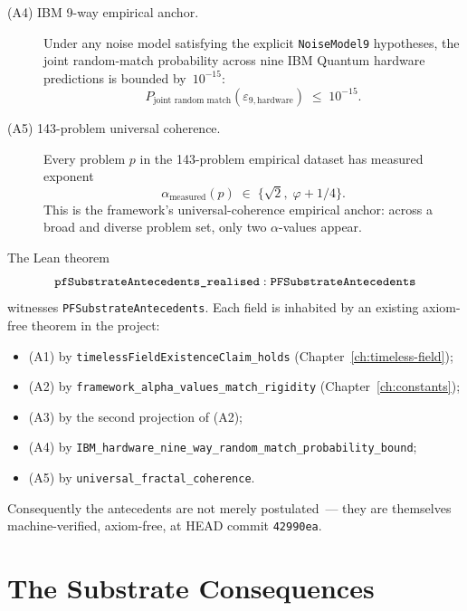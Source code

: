 \begin{definition}
\begin{description}
\item[\textnormal{(A4) IBM 9-way empirical anchor.}]
Under any noise model satisfying the explicit
\texttt{NoiseModel9} hypotheses, the joint random-match
probability across nine IBM Quantum hardware predictions is
bounded by~$10^{-15}$:
\[
P_{\text{joint random match}}(\varepsilon_{9,\text{hardware}})
\;\le\; 10^{-15}.
\]

\item[\textnormal{(A5) 143-problem universal coherence.}]
Every problem $p$ in the 143-problem empirical dataset has
measured exponent
\[
\alpha_{\text{measured}}(p)
\;\in\; \{\sqrt{2}, \; \varphi + 1/4\}.
\]
This is the framework's universal-coherence empirical anchor:
across a broad and diverse problem set, only two $\alpha$-values
appear.
\end{description}
\end{definition}

\begin{theorem}
\label{thm:pf-substrate-antecedents-realised}
The Lean theorem
\[
\texttt{pf\allowbreak{}Substrate\allowbreak{}Antecedents\_\allowbreak{}realised} :
\texttt{PFSubstrateAntecedents}
\]
witnesses \texttt{PFSubstrateAntecedents}. Each field is
inhabited by an existing axiom-free theorem in the project:
\begin{itemize}
\item (A1) by \texttt{timeless\allowbreak{}Field\allowbreak{}Existence\allowbreak{}Claim\_\allowbreak{}holds}
(Chapter~\ref{ch:timeless-field});
\item (A2) by \texttt{framework\_\allowbreak{}alpha\_\allowbreak{}values\_\allowbreak{}match\_\allowbreak{}rigidity}
(Chapter~\ref{ch:constants});
\item (A3) by the second projection of (A2);
\item (A4) by \texttt{IBM\_\allowbreak{}hardware\_\allowbreak{}nine\_\allowbreak{}way\_\allowbreak{}random\_\allowbreak{}match\_\allowbreak{}probability\_\allowbreak{}bound};
\item (A5) by \texttt{universal\_fractal\_coherence}.
\end{itemize}
Consequently the antecedents are not merely postulated~--- they
are themselves machine-verified, axiom-free, at HEAD commit
\texttt{42990ea}.
\end{theorem}

\section{The Substrate Consequences}
\label{sec:substrate-consequences}


